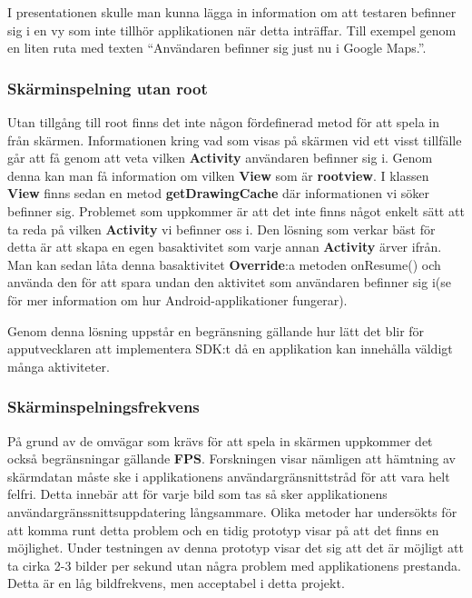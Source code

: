 I presentationen skulle man kunna lägga in information om att testaren befinner sig i en vy som inte tillhör applikationen när detta inträffar. Till exempel genom en liten ruta med texten ``Användaren befinner sig just nu i Google Maps.''.

\subsubsection{Skärminspelning utan root}
\label{screenrecordingwithoutroot}
Utan tillgång till root finns det inte någon fördefinerad metod för att spela in från skärmen. Informationen kring vad som visas på skärmen vid ett visst tillfälle går att få genom att veta vilken \textbf{Activity} användaren befinner sig i. Genom denna kan man få information om vilken \textbf{View} som är \textbf{rootview}. I klassen \textbf{View} finns sedan en metod \textbf{getDrawingCache} där informationen vi söker befinner sig. Problemet som uppkommer är att det inte finns något enkelt sätt att ta reda på vilken \textbf{Activity} vi befinner oss i. Den lösning som verkar bäst för detta är att skapa en egen basaktivitet som varje annan \textbf{Activity} ärver ifrån. Man kan sedan låta denna basaktivitet \textbf{Override}:a metoden onResume() och använda den för att spara undan den aktivitet som användaren befinner sig i(se \parencite{androidfundamentals} för mer information om hur Android-applikationer fungerar).

Genom denna lösning uppstår en begränsning gällande hur lätt det blir för apputvecklaren att implementera SDK:t då en applikation kan innehålla väldigt många aktiviteter. 

\subsubsection{Skärminspelningsfrekvens}
På grund av de omvägar som krävs för att spela in skärmen uppkommer det också begränsningar gällande \textbf{FPS}. Forskningen visar nämligen att hämtning av skärmdatan måste ske i applikationens användargränsnittstråd för att vara helt felfri. Detta innebär att för varje bild som tas så sker applikationens användargränssnittsuppdatering långsammare. Olika metoder har undersökts för att komma runt detta problem och en tidig prototyp visar på att det finns en möjlighet. Under testningen av denna prototyp visar det sig att det är möjligt att ta cirka 2-3 bilder per sekund utan några problem med applikationens prestanda. Detta är en låg bildfrekvens, men acceptabel i detta projekt.

